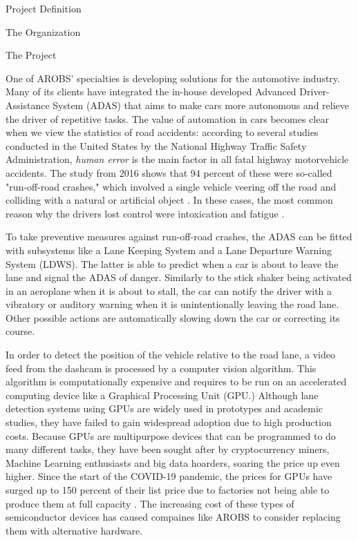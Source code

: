 \documentclass{matthijs}
\begin{document}
\begin{hoofdstuk}{Project Definition}
\begin{paragraaf}{The Organization}
		\end{paragraaf}

		\begin{paragraaf}{The Project}

			One of AROBS' specialties is developing solutions for the automotive industry.
			Many of its clients have integrated the in-house developed Advanced Driver-Assistance System (ADAS) that aims to make cars more autonomous and relieve the driver of repetitive tasks.
			The value of automation in cars becomes clear when we view the statistics of road accidents: according to several studies \cite{nhtsa2017fatal} \cite{liu2009factors} \cite{dod2011run} conducted in the United States by the National Highway Traffic Safety Administration, \textit{human error} is the main factor in all fatal highway motorvehicle accidents.
			The study from 2016 shows that 94 percent of these were so-called "run-off-road crashes," which involved a single vehicle veering off the road and colliding with a natural or artificial object \cite{nhtsa2017fatal}.
			In these cases, the most common reason why the drivers lost control were intoxication and fatigue \cite{nhtsa2017fatal}.
			
			To take preventive measures against run-off-road crashes, the ADAS can be fitted with subsystems like a Lane Keeping System and a Lane Departure Warning System (LDWS).
			The latter is able to predict when a car is about to leave the lane and signal the ADAS of danger.
			Similarly to the stick shaker being activated in an aeroplane when it is about to stall, the car can notify the driver with a vibratory or auditory warning when it is unintentionally leaving the road lane.
			Other possible actions are automatically slowing down the car or correcting its course.

			In order to detect the position of the vehicle relative to the road lane, a video feed from the dashcam is processed by a computer vision algorithm.
			This algorithm is computationally expensive and requires to be run on an accelerated computing device like a Graphical Processing Unit (GPU.)
			Although lane detection systems using GPUs are widely used in prototypes and academic studies, they have failed to gain widespread adoption due to high production costs.
			Because GPUs are multipurpose devices that can be programmed to do many different tasks, they have been sought after by cryptocurrency miners, Machine Learning enthusiasts and big data hoarders, soaring the price up even higher.
			Since the start of the COVID-19 pandemic, the prices for GPUs have surged up to 150 percent of their list price due to factories not being able to produce them at full capacity \cite{cheng2021chip}.
			The increasing cost of these types of semiconductor devices has caused compaines like AROBS to consider replacing them with alternative hardware.
			

\end{paragraaf}
\end{hoofdstuk}
\end{document}
